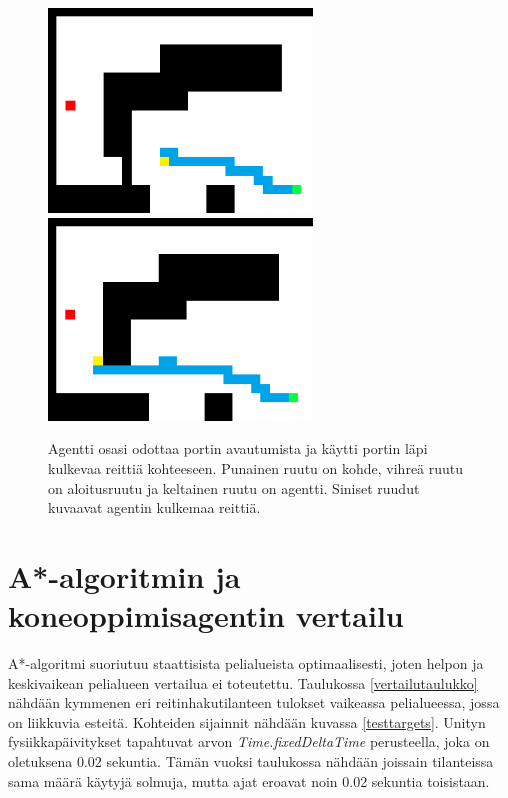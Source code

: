\documentclass[utf8]{gradu3}
\begin{document}
\begin{figure}[h]
\includegraphics[width=7cm]{agent_avoid_gate.png}
\hspace{1 cm}
\includegraphics[width=7cm]{agent_through_gate.png}
\caption{Agentti osasi odottaa portin avautumista ja käytti portin läpi kulkevaa reittiä kohteeseen. Punainen ruutu on kohde, vihreä ruutu on aloitusruutu ja keltainen ruutu on agentti. Siniset ruudut kuvaavat agentin kulkemaa reittiä.}
\label{agentgate}
\end{figure}

\section{A*-algoritmin ja koneoppimisagentin vertailu}
\label{vertailu}

A*-algoritmi suoriutuu staattisista pelialueista optimaalisesti, joten helpon ja keskivaikean pelialueen vertailua ei toteutettu. Taulukossa \ref{vertailutaulukko} nähdään kymmenen eri reitinhakutilanteen tulokset vaikeassa pelialueessa, jossa on liikkuvia esteitä. Kohteiden sijainnit nähdään kuvassa \ref{testtargets}. Unityn fysiikkapäivitykset tapahtuvat arvon \textit{Time.fixedDeltaTime} perusteella, joka on oletuksena 0.02 sekuntia. Tämän vuoksi taulukossa nähdään joissain tilanteissa sama määrä käytyjä solmuja, mutta ajat eroavat noin 0.02 sekuntia toisistaan.
\end{document}
